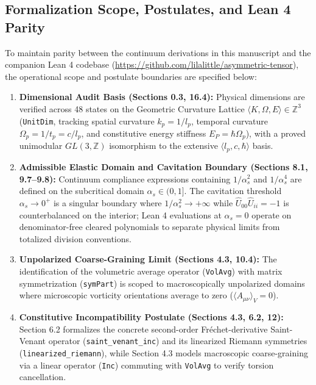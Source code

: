 \subsection*{Formalization Scope, Postulates, and Lean 4 Parity} %
To maintain parity between the continuum derivations in this manuscript and the companion Lean 4 codebase (\href{https://github.com/lilalittle/asymmetric-tensor}{https://github.com/lilalittle/asymmetric-tensor}), the operational scope and postulate boundaries are specified below: %
\begin{enumerate} %
    \item \textbf{Dimensional Audit Basis (Sections 0.3, 16.4):} Physical dimensions are verified across 48 states on the Geometric Curvature Lattice $\langle K, \Omega, E \rangle \in \mathbb{Z}^3$ (\texttt{UnitDim}, tracking spatial curvature $k_p = 1/l_p$, temporal curvature $\Omega_p = 1/t_p = c/l_p$, and constitutive energy stiffness $E_P = \hbar \Omega_p$), with a proved unimodular $GL(3,\mathbb{Z})$ isomorphism to the extensive $\langle l_p, c, \hbar \rangle$ basis. %
    \item \textbf{Admissible Elastic Domain and Cavitation Boundary (Sections 8.1, 9.7--9.8):} Continuum compliance expressions containing $1/\alpha_s^2$ and $1/\alpha_s^4$ are defined on the subcritical domain $\alpha_s \in (0, 1]$. The cavitation threshold $\alpha_s \to 0^+$ is a singular boundary where $1/\alpha_s^2 \to +\infty$ while $\hat{U}_{00}\hat{U}_{ii} = -1$ is counterbalanced on the interior; Lean 4 evaluations at $\alpha_s = 0$ operate on denominator-free cleared polynomials to separate physical limits from totalized division conventions. %
    \item \textbf{Unpolarized Coarse-Graining Limit (Sections 4.3, 10.4):} The identification of the volumetric average operator (\texttt{VolAvg}) with matrix symmetrization (\texttt{symPart}) is scoped to macroscopically unpolarized domains where microscopic vorticity orientations average to zero ($\langle A_{\mu\nu} \rangle_V = 0$). %
    \item \textbf{Constitutive Incompatibility Postulate (Sections 4.3, 6.2, 12):} Section 6.2 formalizes the concrete second-order Fr\'echet-derivative Saint-Venant operator (\texttt{saint\_venant\_inc}) and its linearized Riemann symmetries (\texttt{linearized\_riemann}), while Section 4.3 models macroscopic coarse-graining via a linear operator (\texttt{Inc}) commuting with \texttt{VolAvg} to verify torsion cancellation. %

\end{enumerate}
